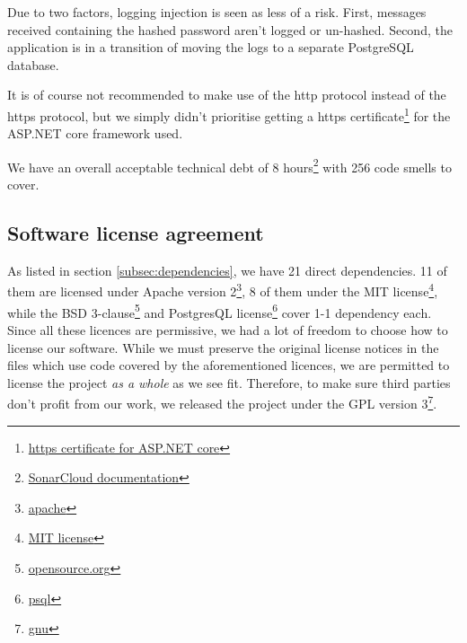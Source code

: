 \documentclass[report/main.tex]{subfiles}
\begin{document}
            Due to two factors, logging injection is seen as less of a risk. First, messages received containing the hashed password aren't logged or un-hashed. Second, the application is in a transition of moving the logs to a separate PostgreSQL database.
            
            It is of course not recommended to make use of the http protocol instead of the https protocol, but we simply didn't prioritise getting a https certificate\footnote{\href{https://docs.microsoft.com/en-us/aspnet/core/security/enforcing-ssl?view=aspnetcore-5.0\&tabs=visual-studio}{https certificate for ASP.NET core}} for the ASP.NET core framework used.
            
            We have an overall acceptable technical debt of 8 hours\footnote{\href{https://docs.sonarqube.org/latest/user-guide/metric-definitions/\#header-4}{SonarCloud documentation}} with 256 code smells to cover.
    
        \subsection{Software license agreement}
            As listed in section \ref{subsec:dependencies}, we have 21 direct dependencies. 11 of them are licensed under Apache version 2\footnote{\href{https://www.apache.org/licenses/LICENSE-2.0}{apache}}, 8 of them under the MIT license\footnote{\href{https://opensource.org/licenses/MIT}{MIT license}}, while the BSD 3-clause\footnote{\href{https://opensource.org/licenses/BSD-3-Clause}{opensource.org}} and PostgresQL license\footnote{\href{https://www.postgresql.org/about/licence/}{psql}} cover 1-1 dependency each. Since all these licences are permissive, we had a lot of freedom to choose how to license our software. While we must preserve the original license notices in the files which use code covered by the aforementioned licences, we are permitted to license the project \textit{as a whole} as we see fit. Therefore, to make sure third parties don't profit from our work, we released the project under the GPL version 3\footnote{\href{https://www.gnu.org/licenses/gpl-3.0.en.html}{gnu}}.
    
\end{document}
